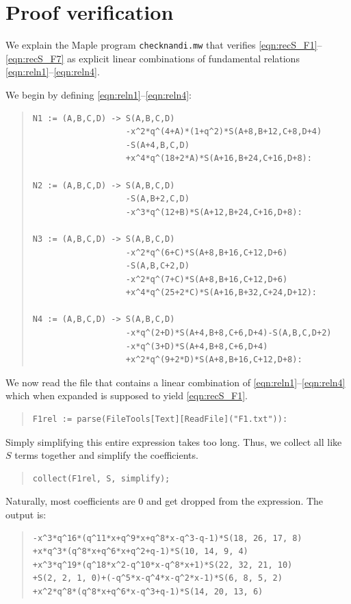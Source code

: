 \documentclass[ALCO,Unicode,published]{cedram}
\begin{document}
\section{Proof verification}
\label{sec:proofverification}

We explain the Maple program \texttt{checknandi.mw} that verifies
\eqref{eqn:recS_F1}--\eqref{eqn:recS_F7} as explicit linear combinations of 
fundamental relations \eqref{eqn:reln1}--\eqref{eqn:reln4}.

We begin by defining \eqref{eqn:reln1}--\eqref{eqn:reln4}:
\begin{quote}
\begin{verbatim}
N1 := (A,B,C,D) -> S(A,B,C,D)
                   -x^2*q^(4+A)*(1+q^2)*S(A+8,B+12,C+8,D+4)
                   -S(A+4,B,C,D)
                   +x^4*q^(18+2*A)*S(A+16,B+24,C+16,D+8):

N2 := (A,B,C,D) -> S(A,B,C,D)
                   -S(A,B+2,C,D)
                   -x^3*q^(12+B)*S(A+12,B+24,C+16,D+8): 

N3 := (A,B,C,D) -> S(A,B,C,D)
                   -x^2*q^(6+C)*S(A+8,B+16,C+12,D+6)
                   -S(A,B,C+2,D)
                   -x^2*q^(7+C)*S(A+8,B+16,C+12,D+6)
                   +x^4*q^(25+2*C)*S(A+16,B+32,C+24,D+12):

N4 := (A,B,C,D) -> S(A,B,C,D)
                   -x*q^(2+D)*S(A+4,B+8,C+6,D+4)-S(A,B,C,D+2)
                   -x*q^(3+D)*S(A+4,B+8,C+6,D+4)
                   +x^2*q^(9+2*D)*S(A+8,B+16,C+12,D+8):
\end{verbatim}
\end{quote}
We now read the file that contains a linear combination of 
\eqref{eqn:reln1}--\eqref{eqn:reln4} which when expanded is supposed
to yield \eqref{eqn:recS_F1}.
\begin{quote}
\begin{verbatim}
F1rel := parse(FileTools[Text][ReadFile]("F1.txt")):
\end{verbatim}
\end{quote}
Simply simplifying this entire expression takes too long.
Thus, we collect all like $S$ terms together and simplify the coefficients.
\begin{quote}
\begin{verbatim}
collect(F1rel, S, simplify);
\end{verbatim}
\end{quote}
Naturally, most coefficients are $0$ and get dropped from the expression.
The output is:
\begin{quote}
\begin{verbatim}
-x^3*q^16*(q^11*x+q^9*x+q^8*x-q^3-q-1)*S(18, 26, 17, 8)
+x*q^3*(q^8*x+q^6*x+q^2+q-1)*S(10, 14, 9, 4)
+x^3*q^19*(q^18*x^2-q^10*x-q^8*x+1)*S(22, 32, 21, 10)
+S(2, 2, 1, 0)+(-q^5*x-q^4*x-q^2*x-1)*S(6, 8, 5, 2)
+x^2*q^8*(q^8*x+q^6*x-q^3+q-1)*S(14, 20, 13, 6)
\end{verbatim}
\end{quote}
\end{document}
